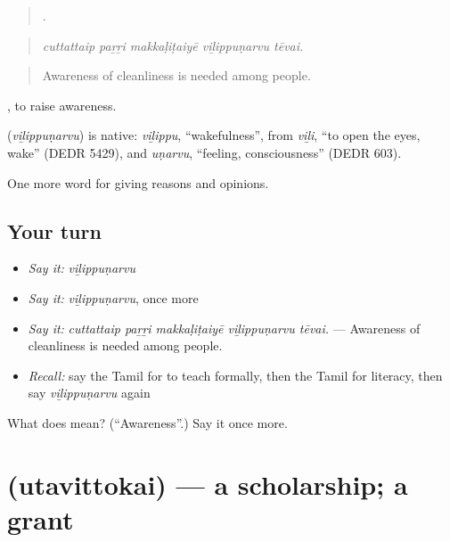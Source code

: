 \begin{quote}
    .
\end{quote}

\begin{quote}
\emph{cuttattaip paṟṟi makkaḷiṭaiyē viḻippuṇarvu tēvai.}
\end{quote}

\begin{quote}
Awareness of cleanliness is needed among people.
\end{quote}

 , to raise awareness.

\begin{cousinweb}
\textbf{} (\emph{viḻippuṇarvu}) is native: \emph{viḻippu}, \textquotedblleft{}wakefulness\textquotedblright{}, from \emph{viḻi}, \textquotedblleft{}to open the eyes, wake\textquotedblright{} (DEDR 5429), and \emph{uṇarvu}, \textquotedblleft{}feeling, consciousness\textquotedblright{} (DEDR 603).
\end{cousinweb}

\begin{grammarlens}[title={What you've built}]
One more word for giving reasons and opinions.
\end{grammarlens}

\subsection*{Your turn}
\begin{itemize}
\raggedright
  \item \emph{Say it:} \emph{viḻippuṇarvu}
  \item \emph{Say it:} \emph{viḻippuṇarvu}, once more
  \item \emph{Say it:} \emph{cuttattaip paṟṟi makkaḷiṭaiyē viḻippuṇarvu tēvai.} — Awareness of cleanliness is needed among people.
  \item \emph{Recall:} say the Tamil for to teach formally, then the Tamil for literacy, then say \emph{viḻippuṇarvu} again
\end{itemize}

\begin{tcolorbox}[breakable,colback=teal!4,colframe=teal!35!black,title={Before you move on}]
What does  mean? (\textquotedblleft{}Awareness\textquotedblright{}.) Say it once more.
\end{tcolorbox}
\section[\texorpdfstring{\ta{உதவித்தொகை} (utavittokai)}{உதவித்தொகை (utavittokai)}]{ (utavittokai) — a scholarship; a grant}

